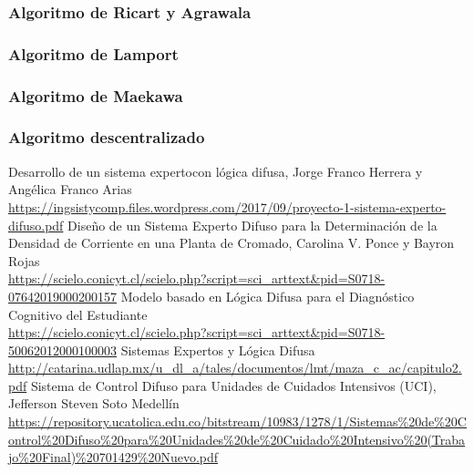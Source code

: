 \documentclass[a4paper, 11pt, titlepage]{article}
\begin{document}
        \subsubsection{Algoritmo de Ricart y Agrawala}

        \subsubsection{Algoritmo de Lamport}

        \subsubsection{Algoritmo de Maekawa}

        \subsubsection{Algoritmo descentralizado}

\newpage
\begin{thebibliography}{X}
    \bibitem{} Desarrollo de un sistema expertocon lógica difusa, Jorge Franco Herrera y Angélica Franco Arias \\ \url{https://ingsistycomp.files.wordpress.com/2017/09/proyecto-1-sistema-experto-difuso.pdf}
    \bibitem{} Diseño de un Sistema Experto Difuso para la Determinación de la Densidad de Corriente en una Planta de Cromado, Carolina V. Ponce y Bayron Rojas \\ \url{https://scielo.conicyt.cl/scielo.php?script=sci_arttext&pid=S0718-07642019000200157}
    \bibitem{} Modelo basado en Lógica Difusa para el Diagnóstico Cognitivo del Estudiante \\ \url{https://scielo.conicyt.cl/scielo.php?script=sci_arttext&pid=S0718-50062012000100003}
    \bibitem{} Sistemas Expertos y Lógica Difusa \\ \url{http://catarina.udlap.mx/u_dl_a/tales/documentos/lmt/maza_c_ac/capitulo2.pdf}
    \bibitem{} Sistema de Control Difuso para Unidades de Cuidados Intensivos (UCI), Jefferson Steven Soto Medellín \\ \url{https://repository.ucatolica.edu.co/bitstream/10983/1278/1/Sistemas%20de%20Control%20Difuso%20para%20Unidades%20de%20Cuidado%20Intensivo%20(Trabajo%20Final)%20701429%20Nuevo.pdf}
\end{thebibliography}
\end{document}
